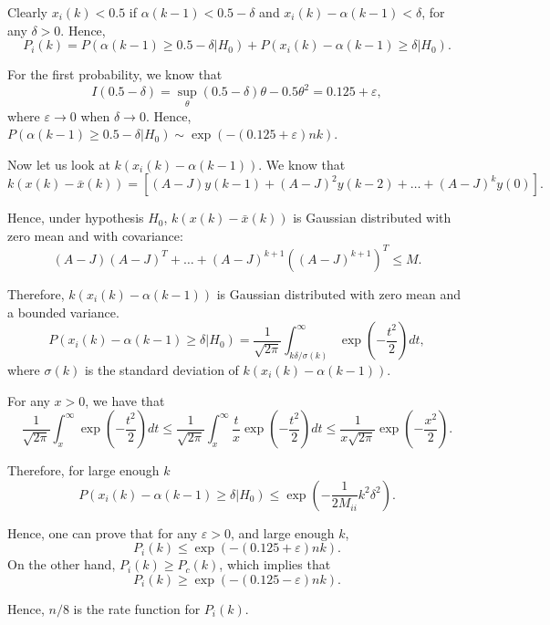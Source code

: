 \documentclass{article}
\begin{document}
Clearly $x_i(k)< 0.5$ if $\alpha(k-1) <0.5-\delta$ and $x_i(k)-\alpha(k-1)<\delta$, for any $\delta > 0$. Hence,
\begin{displaymath}
 P_i(k) = P(\alpha(k-1) \geq 0.5-\delta|H_0) + P(x_i(k)-\alpha(k-1)\geq \delta|H_0).
\end{displaymath}

For the first probability, we know that 
\begin{displaymath}
  I(0.5-\delta) = \sup_{\theta} (0.5-\delta)\theta - 0.5\theta^2 = 0.125+\varepsilon,
\end{displaymath}
where $\varepsilon \rightarrow 0$ when $\delta \rightarrow 0$. Hence, $P(\alpha(k-1) \geq 0.5-\delta|H_0)\sim \exp(-(0.125+\varepsilon)nk)$.

Now let us look at $k(x_i(k) - \alpha(k-1))$. We know that
\begin{displaymath}
 k( x(k) - \bar x(k) )= \left[(A-J)y(k-1) +  (A-J)^2y(k-2) + \dots + (A-J)^{k} y(0)\right].
\end{displaymath}

Hence, under hypothesis $H_0$, $k(x(k) - \bar x(k))$ is Gaussian distributed with zero mean and with covariance:
\begin{displaymath}
  (A-J)(A-J)^T + \dots + (A-J)^{k+1} \left( (A-J)^{k+1} \right)^T \leq M.
\end{displaymath}

Therefore, $k(x_i(k)-\alpha(k-1))$ is Gaussian distributed with zero mean and a bounded variance. 
\begin{displaymath}
  P(x_i(k)-\alpha(k-1)\geq \delta| H_0) =\frac{1}{\sqrt{2\pi}} \int_{k\delta/\sigma(k)}^\infty \exp\left(-\frac{t^2}{2}\right)dt,
\end{displaymath}
where $\sigma(k)$ is the standard deviation of $k(x_i(k)-\alpha(k-1))$.

For any $x > 0$, we have that
\begin{displaymath}
  \frac{1}{\sqrt{2\pi}} \int_{x}^\infty \exp\left(-\frac{t^2}{2}\right)dt \leq \frac{1}{\sqrt{2\pi}} \int_{x}^\infty\frac{t}{x} \exp\left(-\frac{t^2}{2}\right)dt \leq \frac{1}{x\sqrt{2\pi}}\exp\left( -\frac{x^2}{2} \right).
\end{displaymath}

Therefore, for large enough $k$
\begin{displaymath}
  P(x_i(k)-\alpha(k-1)\geq \delta| H_0) \leq \exp\left( -\frac{1}{2M_{ii}}k^2\delta^2 \right).
\end{displaymath}

Hence, one can prove that for any $\varepsilon > 0$, and large enough $k$,
\begin{displaymath}
 P_i(k)\leq \exp\left( -(0.125+\varepsilon)nk \right).
\end{displaymath}
On the other hand, $P_i(k) \geq P_c(k)$, which implies that
\begin{displaymath}
 P_i(k)\geq \exp\left( -(0.125-\varepsilon)nk \right).
\end{displaymath}

Hence, $n/8$ is the rate function for $P_i(k)$.
\end{document}
